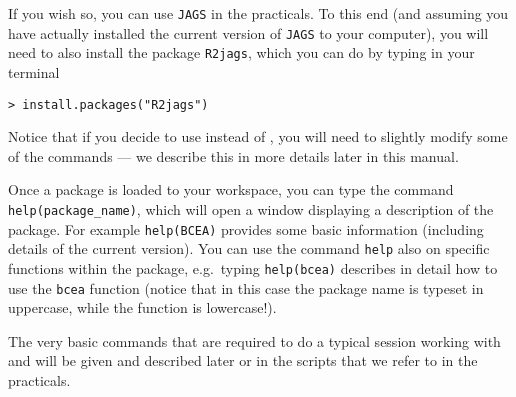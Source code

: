 If you wish so, you can use \texttt{JAGS} in the practicals. To this end (and assuming you have actually installed the current version of \texttt{JAGS} to your computer), you will need to also install the package \texttt{R2jags}, which you can do by typing in your \R terminal
\begin{lstlisting}
> install.packages("R2jags")
\end{lstlisting}
Notice that if you decide to use \jags instead of \bugs, you will need to slightly modify some of the commands --- we describe this in more details later in this manual.

Once a package is loaded to your \R workspace, you can type the command \texttt{help(package\_name)}, which will open a window displaying a description of the package. For example \texttt{help(BCEA)} provides some basic information (including details of the current version). You can use the command \texttt{help} also on specific functions within the package, e.g.\ typing \texttt{help(bcea)} describes in detail how to use the \texttt{bcea} function (notice that in this case the package name is typeset in uppercase, while the function is lowercase!).

The very basic commands that are required to do a typical \R session working with \bugs and \bcea will be given and described later or in the scripts that we refer to in the practicals.
